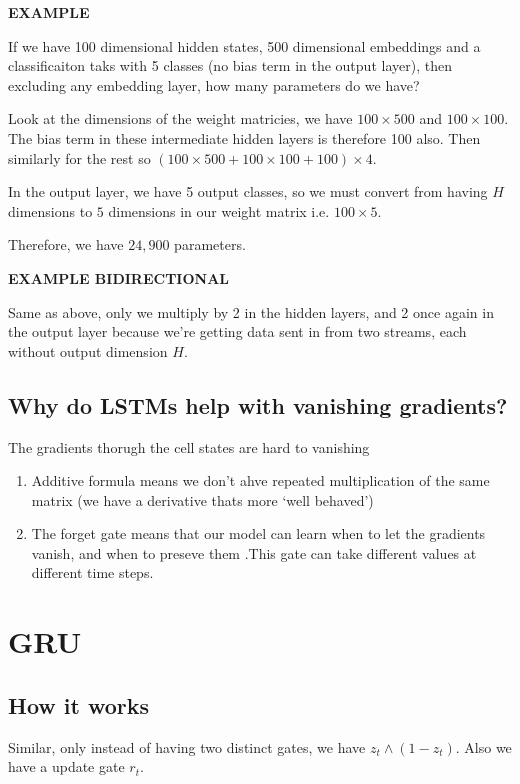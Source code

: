\documentclass[11pt]{article}
\begin{document}
\textbf{EXAMPLE}

If we have 100 dimensional hidden states, 500 dimensional embeddings and a classificaiton taks with 5 classes (no bias term in the output layer), then excluding any embedding layer, how many parameters do we have?

Look at the dimensions of the weight matricies, we have $100 \times 500$ and $100 \times 100$. The bias term in these intermediate hidden layers is therefore 100 also. Then similarly for the rest so $(100 \times 500 + 100 \times 100 + 100)\times 4$.

In the output layer, we have 5 output classes, so we must convert from having $H$ dimensions to $5$ dimensions in our weight matrix i.e. $100\times 5$.

Therefore, we have $24,900$ parameters.

\textbf{EXAMPLE BIDIRECTIONAL}

Same as above, only we multiply by 2 in the hidden layers, and 2 once again in the output layer because we're getting data sent in from two streams, each without output dimension $H$.

\subsection{Why do LSTMs help with vanishing gradients?}

The gradients thorugh the cell states are hard to vanishing
\begin{enumerate}
    \item Additive formula means we don't ahve repeated multiplication of the same matrix (we have a derivative thats more `well behaved')
    \item The forget gate means that our model can learn when to let the gradients vanish, and when to preseve them .This gate can take different values at different time steps.
\end{enumerate}

\section{GRU}

\subsection{How it works}

Similar, only instead of having two distinct gates, we have $z_t \wedge (1-z_t)$. Also we have a update gate $r_t$.
\end{document}
